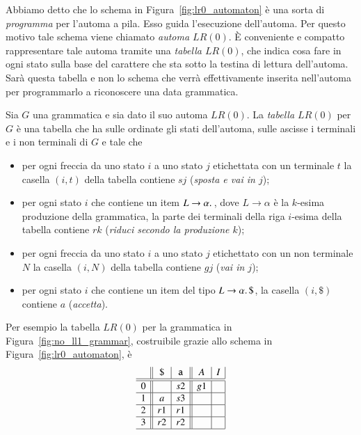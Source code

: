 Abbiamo detto che lo schema in Figura~\ref{fig:lr0_automaton} \`e una
sorta di \emph{programma} per l'automa a pila. Esso guida l'esecuzione
dell'automa. Per questo motivo tale schema viene
chiamato \emph{automa $\mathit{LR}(0)$}.
\`E conveniente e compatto rappresentare
tale automa tramite una \emph{tabella $\mathit{LR}(0)$},
che indica cosa fare in ogni
stato sulla base del carattere che sta sotto la testina di lettura dell'automa.
Sar\`a questa tabella e non lo schema che verr\`a effettivamente inserita
nell'automa per programmarlo a riconoscere una data grammatica.
%
\begin{definition}\label{def:lr0_table}
Sia $G$ una grammatica e sia dato il suo automa $\mathit{LR}(0)$.
La \emph{tabella $\mathit{LR}(0)$}
per $G$ \`e una tabella che ha sulle ordinate gli
stati dell'automa, sulle ascisse i terminali e i non terminali di $G$ e tale
che
\begin{itemize}
\item per ogni freccia da uno stato $i$ a uno stato $j$ etichettata con
      un terminale $t$ la casella $(i,t)$ della tabella contiene $sj$
      (\emph{sposta e vai in $j$});
\item per ogni stato $i$ che contiene un item $L\to\alpha.\,$, dove
      $L\to\alpha$ \`e la $k$-esima produzione della grammatica,
      la parte dei terminali della
      riga $i$-esima della tabella contiene $rk$ (\emph{riduci secondo
      la produzione $k$});
\item per ogni freccia da uno stato $i$ a uno stato $j$ etichettato con
      un non terminale $N$ la casella $(i,N)$ della tabella contiene $gj$
      (\emph{vai in $j$});
\item per ogni stato $i$ che contiene un item del tipo $L\to\alpha.\,
      \mathtt{\$}$, la casella $(i,\mathtt{\$})$ contiene $a$ (\emph{accetta}).
\end{itemize}
\end{definition}
%
\noindent
Per esempio la tabella $\mathit{LR}(0)$ per la grammatica in
Figura~\ref{fig:no_ll1_grammar}, costruibile grazie allo schema in
Figura~\ref{fig:lr0_automaton}, \`e
\begin{equation}\label{eq:lr0_table}
\begin{array}{c||c|c||c|c|}
  & \mathtt{\$} & \mathtt{a} & A & I \\\hline\hline
0 &             & s2         & g1 &  \\\hline
1 & a           & s3         &    &  \\\hline
2 & r1          & r1         &    &  \\\hline
3 & r2          & r2         &    &  \\\hline
\end{array}
\end{equation}
